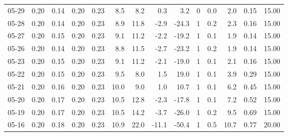 \begin{threeparttable}
{\begin{tabular}{lrrrrrrrrrrrrr}
  05-29 &          0.20 &          0.14 &          0.20 &        0.23 &                 8.5 &                 8.2 &        0.3 &          3.2 &              0 &                 0.0 &              2.0 &            0.15 &                  15.00 \\
  05-28 &          0.20 &          0.14 &          0.20 &        0.23 &                 8.9 &                11.8 &       -2.9 &        -24.3 &              1 &                 0.2 &              2.3 &            0.16 &                  15.00 \\
  05-27 &          0.20 &          0.15 &          0.20 &        0.23 &                 9.1 &                11.2 &       -2.2 &        -19.2 &              1 &                 0.1 &              1.9 &            0.14 &                  15.00 \\
  05-26 &          0.20 &          0.14 &          0.20 &        0.23 &                 8.8 &                11.5 &       -2.7 &        -23.2 &              1 &                 0.2 &              1.9 &            0.14 &                  15.00 \\
  05-23 &          0.20 &          0.15 &          0.20 &        0.23 &                 9.1 &                11.2 &       -2.1 &        -19.0 &              1 &                 0.1 &              2.1 &            0.16 &                  15.00 \\
  05-22 &          0.20 &          0.15 &          0.20 &        0.23 &                 9.5 &                 8.0 &        1.5 &         19.0 &              1 &                 0.1 &              3.9 &            0.29 &                  15.00 \\
  05-21 &          0.20 &          0.16 &          0.20 &        0.23 &                10.0 &                 9.0 &        1.0 &         10.7 &              1 &                 0.1 &              6.2 &            0.45 &                  15.00 \\
  05-20 &          0.20 &          0.17 &          0.20 &        0.23 &                10.5 &                12.8 &       -2.3 &        -17.8 &              1 &                 0.1 &              7.2 &            0.52 &                  15.00 \\
  05-19 &          0.20 &          0.17 &          0.20 &        0.23 &                10.5 &                14.2 &       -3.7 &        -26.0 &              1 &                 0.2 &              9.5 &            0.69 &                  15.00 \\
  05-16 &          0.20 &          0.18 &          0.20 &        0.23 &                10.9 &                22.0 &      -11.1 &        -50.4 &              1 &                 0.5 &             10.7 &            0.77 &                  20.00 \\

\end{tabular}}
\end{threeparttable}
